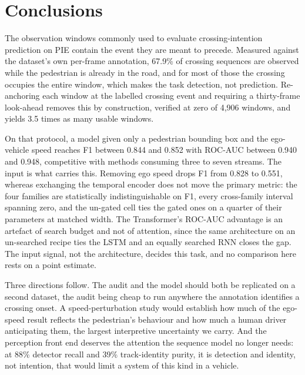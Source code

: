 \documentclass[mti,article,submit,moreauthors]{Definitions/mdpi}
\begin{document}
\section{Conclusions}
\label{sec:conclusions}

The observation windows commonly used to evaluate crossing-intention prediction on PIE contain the event they are meant to precede. Measured against the dataset's own per-frame annotation, 67.9\% of crossing sequences are observed while the pedestrian is already in the road, and for most of those the crossing occupies the entire window, which makes the task detection, not prediction. Re-anchoring each window at the labelled crossing event and requiring a thirty-frame look-ahead removes this by construction, verified at zero of 4,906 windows, and yields 3.5 times as many usable windows.

On that protocol, a model given only a pedestrian bounding box and the ego-vehicle speed reaches F1 between 0.844 and 0.852 with ROC-AUC between 0.940 and 0.948, competitive with methods consuming three to seven streams. The input is what carries this. Removing ego speed drops F1 from 0.828 to 0.551, whereas exchanging the temporal encoder does not move the primary metric: the four families are statistically indistinguishable on F1, every cross-family interval spanning zero, and the un-gated cell ties the gated ones on a quarter of their parameters at matched width. The Transformer's ROC-AUC advantage is an artefact of search budget and not of attention, since the same architecture on an un-searched recipe ties the LSTM and an equally searched RNN closes the gap. The input signal, not the architecture, decides this task, and no comparison here rests on a point estimate.

Three directions follow. The audit and the model should both be replicated on a second dataset, the audit being cheap to run anywhere the annotation identifies a crossing onset. A speed-perturbation study would establish how much of the ego-speed result reflects the pedestrian's behaviour and how much a human driver anticipating them, the largest interpretive uncertainty we carry. And the perception front end deserves the attention the sequence model no longer needs: at 88\% detector recall and 39\% track-identity purity, it is detection and identity, not intention, that would limit a system of this kind in a vehicle.

\vspace{6pt}

\end{document}
